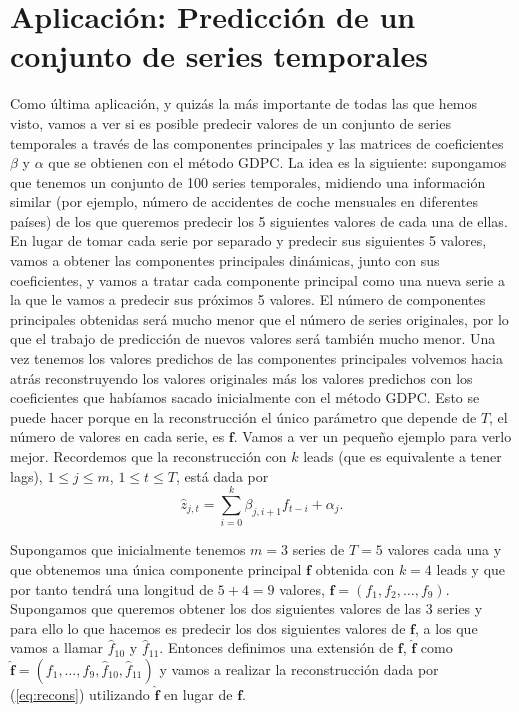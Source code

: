 

\section{Aplicación: Predicción de un conjunto de series temporales}

Como última aplicación, y quizás la más importante de todas las que hemos visto, vamos a ver si es posible predecir valores de un conjunto de series temporales a través de las componentes principales y las matrices de coeficientes $\beta$ y $\alpha$ que se obtienen con el método GDPC. La idea es la siguiente: supongamos que tenemos un conjunto de 100 series temporales, midiendo una información similar (por ejemplo, número de accidentes de coche mensuales en diferentes países) de los que queremos predecir los 5 siguientes valores de cada una de ellas. En lugar de tomar cada serie por separado y predecir sus siguientes 5 valores, vamos a obtener las componentes principales dinámicas, junto con sus coeficientes, y vamos a tratar cada componente principal como una nueva serie a la que le vamos a predecir sus próximos 5 valores. El número de componentes principales obtenidas será mucho menor que el número de series originales, por lo que el trabajo de predicción de nuevos valores será también mucho menor. Una vez tenemos los valores predichos de las componentes principales volvemos hacia atrás reconstruyendo los valores originales más los valores predichos con los coeficientes que habíamos sacado inicialmente con el método GDPC. Esto se puede hacer porque en la reconstrucción el único parámetro que depende de $T$, el número de valores en cada serie, es $\mathbf{f}$. Vamos a ver un pequeño ejemplo para verlo mejor. Recordemos que la reconstrucción con $k$ leads (que es equivalente a tener lags), $1 \leq j \leq m$, $1 \leq t \leq T$, está dada por
\begin{equation}\label{eq:recons}
	\widehat{z}_{j,t} = \sum_{i=0}^k \beta_{j,i+1}f_{t-i} + \alpha_j.
\end{equation}

Supongamos que inicialmente tenemos $m=3$ series de $T=5$ valores cada una y que obtenemos una única componente principal $\mathbf{f}$ obtenida con $k=4$ leads y que por tanto tendrá una longitud de $5+4=9$ valores, $\mathbf{f} = (f_1, f_2, \dots, f_9)$. Supongamos que queremos obtener los dos siguientes valores de las 3 series y para ello lo que hacemos es predecir los dos siguientes valores de $\mathbf{f}$, a los que vamos a llamar $\widehat{f}_{10}$ y $\widehat{f}_{11}$. Entonces definimos una extensión de $\mathbf{f}$, $\mathbf{\widehat{f}}$ como $\mathbf{\widehat{f}} = (f_1, \dots, f_9, \widehat{f}_{10}, \widehat{f}_{11})$ y vamos a realizar la reconstrucción dada por (\ref{eq:recons}) utilizando $\mathbf{\widehat{f}}$ en lugar de $\mathbf{f}$.\\

